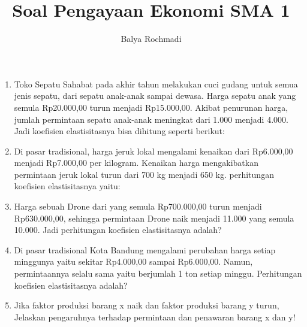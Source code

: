 \documentclass[12pt,a4paper,draft,final,oneside,twoside,openright,openany]{article}
\author{Balya Rochmadi}
\title{Soal Pengayaan Ekonomi SMA 1 }
\begin{document}
	\maketitle
	\begin{enumerate}
		\item Toko Sepatu Sahabat pada akhir tahun melakukan cuci gudang untuk semua jenis sepatu, dari sepatu anak-anak sampai dewasa. Harga sepatu anak yang semula Rp20.000,00 turun menjadi Rp15.000,00. Akibat penurunan harga, jumlah permintaan sepatu anak-anak meningkat dari 1.000 menjadi 4.000. Jadi koefisien elastisitasnya bisa dihitung seperti berikut:
		\item  Di pasar tradisional, harga jeruk lokal mengalami kenaikan dari Rp6.000,00 menjadi Rp7.000,00 per kilogram. Kenaikan harga mengakibatkan permintaan jeruk lokal turun dari 700 kg menjadi 650 kg. perhitungan koefisien elastisitasnya yaitu:
		\item Harga sebuah Drone dari yang semula Rp700.000,00 turun menjadi Rp630.000,00, sehingga permintaan Drone naik menjadi 11.000 yang semula 10.000. Jadi perhitungan koefisien elastisitasnya adalah?
		\item Di pasar tradisional Kota Bandung mengalami perubahan harga setiap minggunya yaitu sekitar Rp4.000,00 sampai Rp6.000,00. Namun, permintaannya selalu sama yaitu berjumlah 1 ton setiap minggu. Perhitungan koefisien elastisitasnya adalah?
		\item Jika faktor produksi barang x naik dan faktor produksi barang y turun, Jelaskan  pengaruhnya terhadap permintaan dan penawaran barang x dan y!
	\end{enumerate}
\end{document}
